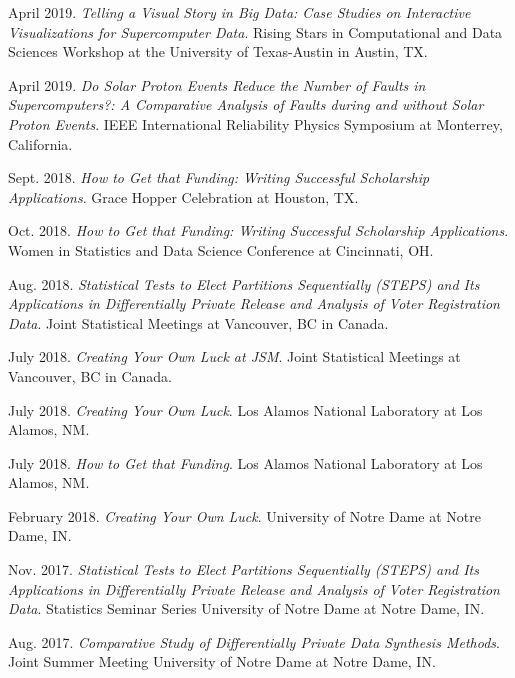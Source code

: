 \documentclass[11pt, letterpaper, roman]{moderncv} %
\begin{document}
\begin{etaremune}[topsep=0pt, itemsep=0.75pt, partopsep=0pt, parsep=0pt]
    \item April 2019. \textit{Telling a Visual Story in Big Data: Case Studies on Interactive Visualizations for Supercomputer Data}. Rising Stars in Computational and Data Sciences Workshop at the University of Texas-Austin in Austin, TX.
    
    \item April 2019. \textit{Do Solar Proton Events Reduce the Number of Faults in Supercomputers?: A Comparative Analysis of Faults during and without Solar Proton Events}. IEEE International Reliability Physics Symposium at Monterrey, California.
    
    \item Sept. 2018. \textit{How to Get that Funding: Writing Successful Scholarship Applications}. Grace Hopper Celebration at Houston, TX.
    
    \item Oct. 2018. \textit{How to Get that Funding: Writing Successful Scholarship Applications}. Women in Statistics and Data Science Conference at Cincinnati, OH.
    
    \item Aug. 2018. \textit{Statistical Tests to Elect Partitions Sequentially (STEPS) and Its Applications in Differentially Private Release and Analysis of Voter Registration Data}. Joint Statistical Meetings at Vancouver, BC in Canada.
    
    \item July 2018. \textit{Creating Your Own Luck at JSM}. Joint Statistical Meetings at Vancouver, BC in Canada.
    
    \item July 2018. \textit{Creating Your Own Luck}. Los Alamos National Laboratory at Los Alamos, NM.
    
    \item July 2018. \textit{How to Get that Funding}. Los Alamos National Laboratory at Los Alamos, NM.
    
    \item February 2018. \textit{Creating Your Own Luck}. University of Notre Dame at Notre Dame, IN.
    
    \item Nov. 2017. \textit{Statistical Tests to Elect Partitions Sequentially (STEPS) and Its Applications in Differentially Private Release and Analysis of Voter Registration Data}. Statistics Seminar Series University of Notre Dame at Notre Dame, IN.
    
    \item Aug. 2017. \textit{Comparative Study of Differentially Private Data Synthesis Methods}. Joint Summer Meeting University of Notre Dame at Notre Dame, IN.
    

\end{etaremune}
\end{document}
